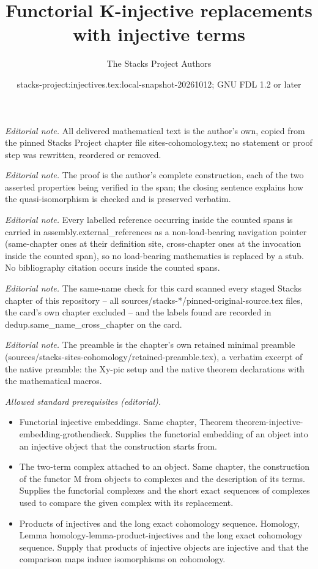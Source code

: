 \documentclass[10pt,a4paper]{amsart}
\title{Functorial K-injective replacements with injective terms}
\author{The Stacks Project Authors}
\date{stacks-project:injectives.tex:local-snapshot-20261012; GNU FDL 1.2 or later}
\theoremstyle{plain}
\theoremstyle{definition}
\theoremstyle{remark}
\numberwithin{equation}{subsection}
\begin{document}
\maketitle
\noindent\textit{Editorial note.} All delivered mathematical text is the author's own, copied from the pinned Stacks Project chapter file sites-cohomology.tex; no statement or proof step was rewritten, reordered or removed.\par\medskip
\noindent\textit{Editorial note.} The proof is the author's complete construction, each of the two asserted properties being verified in the span; the closing sentence explains how the quasi-isomorphism is checked and is preserved verbatim.\par\medskip
\noindent\textit{Editorial note.} Every labelled reference occurring inside the counted spans is carried in assembly.external\_references as a non-load-bearing navigation pointer (same-chapter ones at their definition site, cross-chapter ones at the invocation inside the counted span), so no load-bearing mathematics is replaced by a stub. No bibliography citation occurs inside the counted spans.\par\medskip
\noindent\textit{Editorial note.} The same-name check for this card scanned every staged Stacks chapter of this repository -- all sources/stacks-*/pinned-original-source.tex files, the card's own chapter excluded -- and the labels found are recorded in dedup.same\_name\_cross\_chapter on the card.\par\medskip
\noindent\textit{Editorial note.} The preamble is the chapter's own retained minimal preamble (sources/stacks-sites-cohomology/retained-preamble.tex), a verbatim excerpt of the native preamble: the Xy-pic setup and the native theorem declarations with the mathematical macros.\par\medskip
\noindent\textit{Allowed standard prerequisites (editorial).}\begin{itemize}
\item Functorial injective embeddings. Same chapter, Theorem theorem-injective-embedding-grothendieck. Supplies the functorial embedding of an object into an injective object that the construction starts from.
\item The two-term complex attached to an object. Same chapter, the construction of the functor M from objects to complexes and the description of its terms. Supplies the functorial complexes and the short exact sequences of complexes used to compare the given complex with its replacement.
\item Products of injectives and the long exact cohomology sequence. Homology, Lemma homology-lemma-product-injectives and the long exact cohomology sequence. Supply that products of injective objects are injective and that the comparison maps induce isomorphisms on cohomology.
\end{itemize}\medskip
\end{document}
